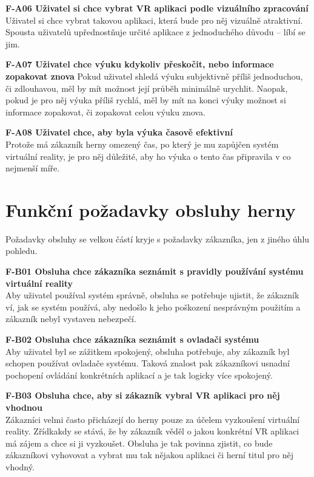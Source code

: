 \textbf{F-A06 Uživatel si chce vybrat VR aplikaci podle vizuálního
zpracování}\\
Uživatel si chce vybrat takovou aplikaci, která bude pro něj vizuálně
atraktivní. Spousta uživatelů upřednostňuje určité aplikace z
jednoduchého důvodu -- líbí se jim.

\textbf{F-A07 Uživatel chce výuku kdykoliv přeskočit, nebo informace
zopakovat znova} Pokud uživatel shledá výuku subjektivně příliš
jednoduchou, či zdlouhavou, měl by mít možnost její průběh minimálně
urychlit. Naopak, pokud je pro něj výuka příliš rychlá, měl by mít na
konci výuky možnost si informace zopakovat, či zopakovat celou výuku
znova.

\textbf{F-A08 Uživatel chce, aby byla výuka časově efektivní}\\
Protože má zákazník herny omezený čas, po který je mu zapůjčen systém
virtuální reality, je pro něj důležité, aby ho výuka o tento čas
připravila v co nejmenší míře.

\section{Funkční požadavky obsluhy
herny}\label{funkux10dnuxed-poux17eadavky-obsluhy-herny}

Požadavky obsluhy se velkou částí kryje s požadavky zákazníka, jen z
jiného úhlu pohledu.

\textbf{F-B01 Obsluha chce zákazníka seznámit s pravidly používání
systému virtuální reality}\\
Aby uživatel používal systém správně, obsluha se potřebuje ujistit, že
zákazník ví, jak se systém používá, aby nedošlo k jeho poškození
nesprávným použitím a zákazník nebyl vystaven nebezpečí.

\textbf{F-B02 Obsluha chce zákazníka seznámit s ovladači systému}\\
Aby uživatel byl se zážitkem spokojený, obsluha potřebuje, aby zákazník
byl schopen používat ovladače systému. Taková znalost pak zákazníkovi
usnadní pochopení ovládání konkrétních aplikací a je tak logicky více
spokojený.

\textbf{F-B03 Obsluha chce, aby si zákazník vybral VR aplikaci pro něj
vhodnou}\\
Zákazníci velmi často přicházejí do herny pouze za účelem vyzkoušení
virtuální reality. Zřídkakdy se stává, že by zákazník věděl o jakou
konkrétní VR aplikaci má zájem a chce si ji vyzkoušet. Obsluha je tak
povinna zjistit, co bude zákazníkovi vyhovovat a vybrat mu tak nějakou
aplikaci či herní titul pro něj vhodný.

